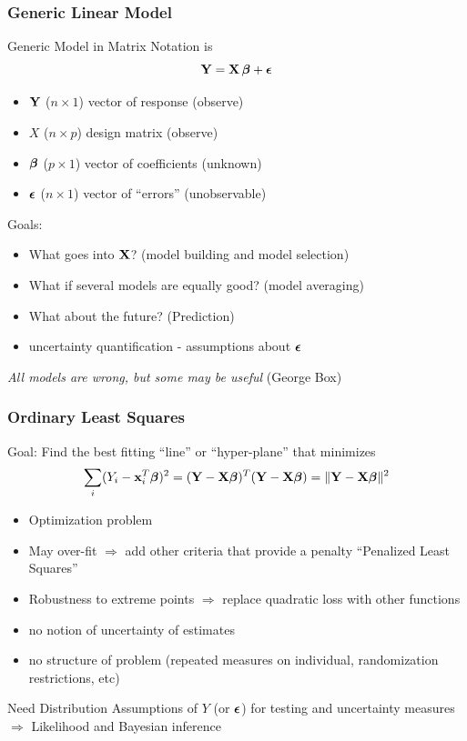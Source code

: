 \documentclass[]{beamer}
\begin{document}
\begin{frame}
  \frametitle{Generic Linear  Model}
  Generic Model in Matrix Notation is
$$
\mathbf{Y}  = \mathbf{X} \, \boldsymbol{\beta} + \boldsymbol{\epsilon}  $$
\pause
\begin{itemize}
\item $\mathbf{Y}$ ($n \times 1$) vector of response   (observe)
\item $X$ ($n \times p$)  design matrix  (observe)
\item $\boldsymbol{\beta}$ ($p \times 1$) vector of coefficients  (unknown)
\item $\boldsymbol{\epsilon}$ ($n \times 1$) vector of ``errors''  (unobservable)
\end{itemize} \pause

Goals: \pause
\begin{itemize}
\item What goes into $\mathbf{X}$?   (model building and model selection) \pause
\item What if several models are equally good?  (model averaging) \pause
\item What about the future?  (Prediction) \pause
\item uncertainty quantification - assumptions about $\boldsymbol{\epsilon}$\pause
\end{itemize}
{\it All models are wrong, but some may be useful }  (George Box)
\end{frame}

\begin{frame}
  \frametitle{Ordinary Least Squares}
  Goal: Find the best fitting ``line'' or ``hyper-plane'' that
  minimizes
$$\sum_i  (Y_i - \mathbf{x}_i^T \boldsymbol{\beta})^2 = (\mathbf{Y} - \mathbf{X}\boldsymbol{\beta})^T(\mathbf{Y} - \mathbf{X} \boldsymbol{\beta}) = \| \mathbf{Y} -
\mathbf{X}\boldsymbol{\beta} \|^2 $$  \pause

\begin{itemize}
\item Optimization problem \pause
\item May over-fit $\Rightarrow$ add other criteria that provide a penalty
  ``Penalized Least Squares'' \pause
\item Robustness to extreme points $\Rightarrow$ replace quadratic
  loss with other functions  \pause
\item no notion of uncertainty of estimates  \pause
\item no structure of problem  (repeated measures on individual,
  randomization restrictions, etc)
\end{itemize}
Need  Distribution Assumptions of $Y$ (or $\boldsymbol{\epsilon}$) for testing and
uncertainty measures \pause $\Rightarrow$ Likelihood  and Bayesian inference
\end{frame}
\end{document}
